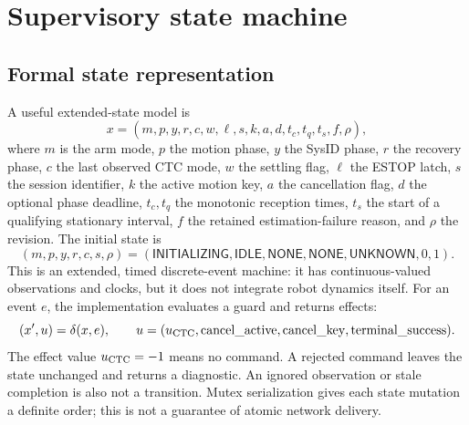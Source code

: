 \documentclass[11pt,a4paper]{report}
\begin{document}
\chapter{Supervisory state machine}\label{ch:supervisor}
\section{Formal state representation}
A useful extended-state model is
\begin{equation}
 x=(m,p,y,r,c,w,\ell,s,k,a,d,t_c,t_q,t_s,f,\rho),
\end{equation}
where $m$ is the arm mode, $p$ the motion phase, $y$ the SysID phase, $r$ the recovery phase, $c$ the last observed CTC mode, $w$ the settling flag, $\ell$ the ESTOP latch, $s$ the session identifier, $k$ the active motion key, $a$ the cancellation flag, $d$ the optional phase deadline, $t_c,t_q$ the monotonic reception times, $t_s$ the start of a qualifying stationary interval, $f$ the retained estimation-failure reason, and $\rho$ the revision. The initial state is
\begin{equation}
 (m,p,y,r,c,s,\rho)=(\mathsf{INITIALIZING},\mathsf{IDLE},\mathsf{NONE},
 \mathsf{NONE},\mathsf{UNKNOWN},0,1).
\end{equation}
This is an extended, timed discrete-event machine: it has continuous-valued observations and clocks, but it does not integrate robot dynamics itself. For an event $e$, the implementation evaluates a guard and returns effects:
\begin{equation}
 (x',u)=\delta(x,e),\qquad
 u=(u_{\rm CTC},\mathrm{cancel\_active},\mathrm{cancel\_key},\mathrm{terminal\_success}).
\end{equation}
The effect value $u_{\rm CTC}=-1$ means no command. A rejected command leaves the state unchanged and returns a diagnostic. An ignored observation or stale completion is also not a transition. Mutex serialization gives each state mutation a definite order; this is not a guarantee of atomic network delivery.
\end{document}
